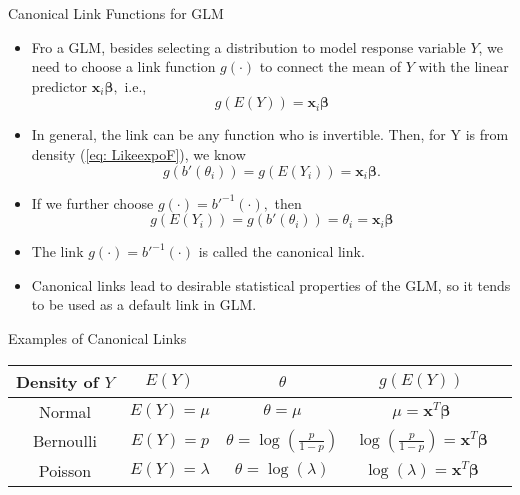 \documentclass{beamer}
\begin{document}
     
        \begin{frame}{Canonical Link Functions for GLM}
        \begin{itemize}
            \item Fro a GLM, besides selecting a distribution to model response variable $Y$, we need to choose a link function $g(\cdot)$ to connect the mean of $Y$ with the linear predictor $\boldsymbol{x}_{i}\boldsymbol{\beta},$ i.e.,
            $$g(E(Y)) =  \boldsymbol{x}_{i}\boldsymbol{\beta}$$
            \item In general, the link can be any function who is invertible. Then, for Y is from density (\ref{eq: LikeexpoF}), we know
            $$g(b'(\theta_{i})) = g(E(Y_{i})) = \boldsymbol{x}_{i}\boldsymbol{\beta}.$$
            \item If we further choose $g(\cdot) =  b'^{-1}(\cdot),$  then
            $$g(E(Y_{i})) = g(b'(\theta_{i})) = \theta_{i} = \boldsymbol{x}_{i}\boldsymbol{\beta}$$
            \item The link $g(\cdot) = b'^{-1}(\cdot)$ is called the canonical link.
            \item Canonical links lead to desirable statistical properties of the GLM, so it tends to be used as a default link in GLM.  
            
        \end{itemize}
        \end{frame}
        
        
        
        \begin{frame}{Examples of Canonical Links}
         \begin{table}
        \centering
        \begin{tabular}{|c|c|c|c|c|}
        \hline
        Density of $Y$ & $E(Y)$ & $\theta$ & $g(E(Y))$ \\
                \hline
        Normal & $E(Y) = \mu$ & $\theta = \mu$ & $ \mu = \boldsymbol{x}^{T}\boldsymbol{\beta}$ \\
        Bernoulli & $E(Y) = p$ & $\theta = \log(\frac{p}{1-p})$ & $\log(\frac{p}{1-p}) = \boldsymbol{x}^{T}\boldsymbol{\beta}$ \\
        Poisson & $E(Y) = \lambda$ & $\theta = \log(\lambda)$ & $ \log(\lambda) = \boldsymbol{x}^{T}\boldsymbol{\beta}$ \\
                \hline
        \end{tabular}
        \end{table}
        \end{frame}
\end{document}
